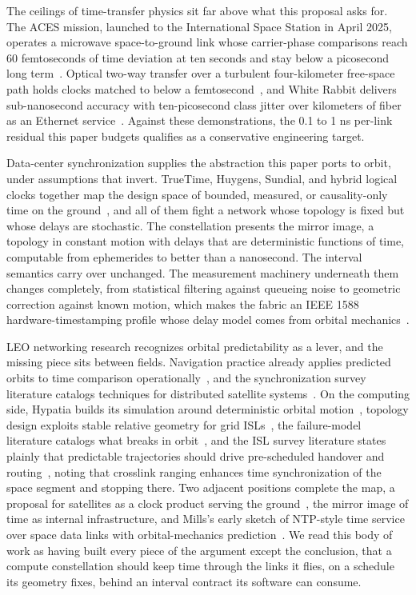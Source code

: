 \documentclass[twocolumn,10pt]{article}
\begin{document}
The ceilings of time-transfer physics sit far above what this proposal asks for. The ACES mission, launched to the International Space Station in April 2025, operates a microwave space-to-ground link whose carrier-phase comparisons reach 60 femtoseconds of time deviation at ten seconds and stay below a picosecond long term~\cite{aces,cacciapuoti2024}. Optical two-way transfer over a turbulent four-kilometer free-space path holds clocks matched to below a femtosecond~\cite{deschenes2016}, and White Rabbit delivers sub-nanosecond accuracy with ten-picosecond class jitter over kilometers of fiber as an Ethernet service~\cite{whiterabbit}. Against these demonstrations, the 0.1 to 1 ns per-link residual this paper budgets qualifies as a conservative engineering target.

Data-center synchronization supplies the abstraction this paper ports to orbit, under assumptions that invert. TrueTime, Huygens, Sundial, and hybrid logical clocks together map the design space of bounded, measured, or causality-only time on the ground~\cite{corbett2012,geng2018,li2020,kulkarni2014}, and all of them fight a network whose topology is fixed but whose delays are stochastic. The constellation presents the mirror image, a topology in constant motion with delays that are deterministic functions of time, computable from ephemerides to better than a nanosecond. The interval semantics carry over unchanged. The measurement machinery underneath them changes completely, from statistical filtering against queueing noise to geometric correction against known motion, which makes the fabric an IEEE 1588 hardware-timestamping profile whose delay model comes from orbital mechanics~\cite{ieee1588,whiterabbit}.

LEO networking research recognizes orbital predictability as a lever, and the missing piece sits between fields. Navigation practice already applies predicted orbits to time comparison operationally~\cite{li2025,itu1153}, and the synchronization survey literature catalogs techniques for distributed satellite systems~\cite{survey2022}. On the computing side, Hypatia builds its simulation around deterministic orbital motion~\cite{kassing2020}, topology design exploits stable relative geometry for grid ISLs~\cite{bhattacherjee2019}, the failure-model literature catalogs what breaks in orbit~\cite{pfandzelter2023}, and the ISL survey literature states plainly that predictable trajectories should drive pre-scheduled handover and routing~\cite{wu2024}, noting that crosslink ranging enhances time synchronization of the space segment and stopping there. Two adjacent positions complete the map, a proposal for satellites as a clock product serving the ground~\cite{ducoing2023}, the mirror image of time as internal infrastructure, and Mills's early sketch of NTP-style time service over space data links with orbital-mechanics prediction~\cite{millspits}. We read this body of work as having built every piece of the argument except the conclusion, that a compute constellation should keep time through the links it flies, on a schedule its geometry fixes, behind an interval contract its software can consume.
\end{document}
